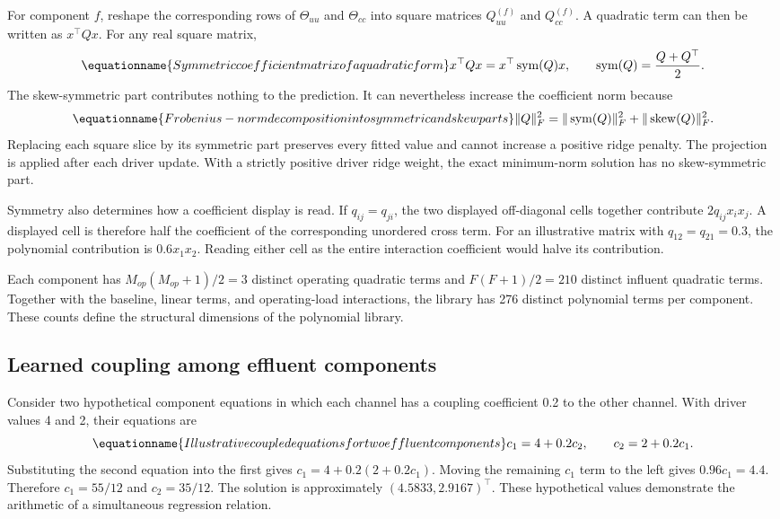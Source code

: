 For component \(f\), reshape the corresponding rows of \(\Theta_{uu}\) and \(\Theta_{cc}\) into square matrices \(Q_{uu}^{(f)}\) and \(Q_{cc}^{(f)}\). A quadratic term can then be written as \(x^\top Qx\). For any real square matrix,
\begin{equation}
\equationname{Symmetric coefficient matrix of a quadratic form}
\label{eq:icsor_quadratic_symmetry}
x^\top Qx=x^\top\operatorname{sym}(Q)x,
\qquad
\operatorname{sym}(Q)=\frac{Q+Q^\top}{2}.
\end{equation}
The skew-symmetric part contributes nothing to the prediction. It can nevertheless increase the coefficient norm because
\begin{equation}
\equationname{Frobenius-norm decomposition into symmetric and skew parts}
\label{eq:icsor_quadratic_norm}
\|Q\|_F^2=
\|\operatorname{sym}(Q)\|_F^2+
\|\operatorname{skew}(Q)\|_F^2.
\end{equation}
Replacing each square slice by its symmetric part preserves every fitted value and cannot increase a positive ridge penalty. The projection is applied after each driver update. With a strictly positive driver ridge weight, the exact minimum-norm solution has no skew-symmetric part.

Symmetry also determines how a coefficient display is read. If \(q_{ij}=q_{ji}\), the two displayed off-diagonal cells together contribute \(2q_{ij}x_i x_j\). A displayed cell is therefore half the coefficient of the corresponding unordered cross term. For an illustrative matrix with \(q_{12}=q_{21}=0.3\), the polynomial contribution is \(0.6x_1x_2\). Reading either cell as the entire interaction coefficient would halve its contribution.

Each component has \(M_{op}(M_{op}+1)/2=3\) distinct operating quadratic terms and \(F(F+1)/2=210\) distinct influent quadratic terms. Together with the baseline, linear terms, and operating-load interactions, the library has 276 distinct polynomial terms per component. These counts define the structural dimensions of the polynomial library.

\subsection{Learned coupling among effluent components}

Consider two hypothetical component equations in which each channel has a coupling coefficient 0.2 to the other channel. With driver values 4 and 2, their equations are
\begin{equation}
\equationname{Illustrative coupled equations for two effluent components}
\label{eq:icsor_scalar_coupling_example}
c_1=4+0.2c_2,
\qquad c_2=2+0.2c_1.
\end{equation}
Substituting the second equation into the first gives \(c_1=4+0.2(2+0.2c_1)\). Moving the remaining \(c_1\) term to the left gives \(0.96c_1=4.4\). Therefore \(c_1=55/12\) and \(c_2=35/12\). The solution is approximately \((4.5833,2.9167)^\top\). These hypothetical values demonstrate the arithmetic of a simultaneous regression relation.

